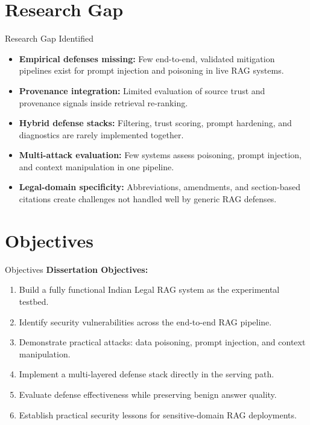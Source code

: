 \documentclass[aspectratio=169]{beamer}
\begin{document}
\section{Research Gap}
\begin{frame}{Research Gap Identified}
    \begin{itemize}
        \setlength\itemsep{0.75em}
        \item \textbf{Empirical defenses missing:} Few end-to-end, validated mitigation pipelines exist for prompt injection and poisoning in live RAG systems.
        \item \textbf{Provenance integration:} Limited evaluation of source trust and provenance signals inside retrieval re-ranking.
        \item \textbf{Hybrid defense stacks:} Filtering, trust scoring, prompt hardening, and diagnostics are rarely implemented together.
        \item \textbf{Multi-attack evaluation:} Few systems assess poisoning, prompt injection, and context manipulation in one pipeline.
        \item \textbf{Legal-domain specificity:} Abbreviations, amendments, and section-based citations create challenges not handled well by generic RAG defenses.
    \end{itemize}
\end{frame}

\section{Objectives}
\begin{frame}{Objectives}
    \textbf{Dissertation Objectives:}
    \vspace{0.25cm}
    \begin{enumerate}
        \setlength\itemsep{0.55em}
        \item Build a fully functional Indian Legal RAG system as the experimental testbed.
        \item Identify security vulnerabilities across the end-to-end RAG pipeline.
        \item Demonstrate practical attacks: data poisoning, prompt injection, and context manipulation.
        \item Implement a multi-layered defense stack directly in the serving path.
        \item Evaluate defense effectiveness while preserving benign answer quality.
        \item Establish practical security lessons for sensitive-domain RAG deployments.
    \end{enumerate}
\end{frame}
\end{document}
